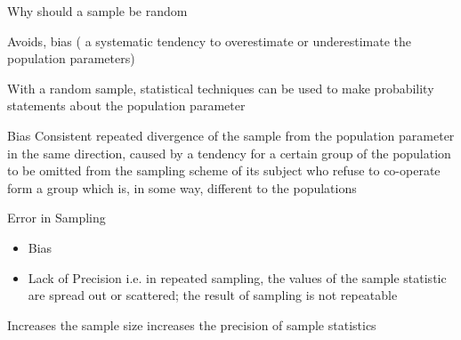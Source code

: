 Why should a sample be random

Avoids, bias ( a systematic tendency to overestimate or underestimate the population parameters)

With a random sample, statistical techniques can be used to make probability statements about the population parameter



Bias Consistent repeated divergence of the sample from the population parameter in the same direction, caused by a tendency for 
a certain group of the population to be omitted from the sampling scheme of its subject who refuse to co-operate form a group which is, in
some way, different to the populations




Error in Sampling

\begin{itemize}
\item Bias
\item Lack of Precision i.e. in repeated sampling, the values of the sample statistic are spread out or scattered; the result of sampling is not 
repeatable
\end{itemize}


Increases the sample size increases the precision of sample statistics
